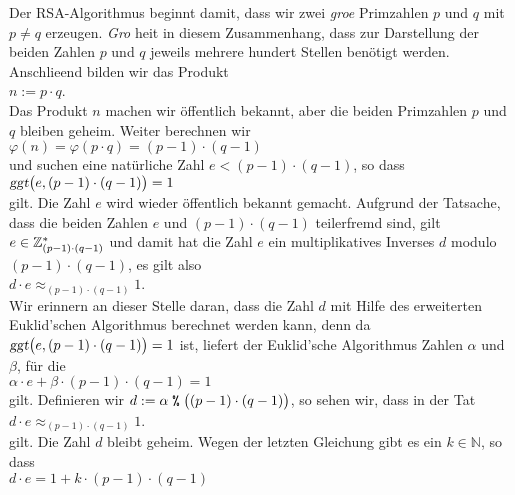 Der RSA-Algorithmus beginnt damit, dass wir zwei \emph{gro\3e} Primzahlen $p$ und $q$ mit $p \not= q$
erzeugen.  \emph{Gro\3} hei\3t in diesem Zusammenhang, dass zur Darstellung der beiden Zahlen $p$ und $q$
jeweils mehrere hundert Stellen ben\"{o}tigt werden.  Anschlie\3end bilden wir das Produkt
\\[0.2cm]
\hspace*{1.3cm}
$n := p \cdot q$.
\\[0.2cm]
Das Produkt $n$ machen wir \"{o}ffentlich bekannt, aber die beiden Primzahlen $p$ und $q$ bleiben geheim.
Weiter berechnen wir
\\[0.2cm]
\hspace*{1.3cm}
$\varphi(n) = \varphi(p \cdot q) = (p-1) \cdot (q-1)$
\\[0.2cm]
und suchen eine nat\"{u}rliche Zahl $e < (p-1) \cdot (q-1)$, so dass 
\\[0.2cm]
\hspace*{1.3cm}
$\textsl{ggt}\bigl(e, (p-1) \cdot (q-1)\bigr) = 1$
\\[0.2cm]
gilt.  Die Zahl $e$ wird wieder \"{o}ffentlich bekannt gemacht.
Aufgrund der Tatsache, dass die beiden Zahlen $e$ und $(p-1) \cdot (q-1)$
teilerfremd sind, gilt $e \in \mathbb{Z}_{(p-1) \cdot (q-1)}^*$ und damit hat die Zahl $e$ ein
multiplikatives Inverses $d$ modulo  $(p-1)\cdot(q-1)$, es gilt also
\\[0.2cm]
\hspace*{1.3cm}
$d \cdot e \approx_{(p-1)\cdot(q-1)} 1$.
\\[0.2cm]
Wir erinnern an dieser Stelle daran, dass die Zahl $d$ mit Hilfe des erweiterten Euklid'schen Algorithmus
berechnet werden kann, denn da $\textsl{ggt}\bigl(e, (p-1)\cdot(q-1)\bigr) = 1$ ist, liefert der
Euklid'sche Algorithmus Zahlen $\alpha$ und $\beta$, f\"{u}r die
\\[0.2cm]
\hspace*{1.3cm}
$\alpha \cdot e + \beta \cdot (p-1) \cdot (q-1) = 1$
\\[0.2cm]
gilt.  Definieren wir $d := \alpha \;\texttt{\%}\; \bigl((p-1) \cdot (q-1)\bigr)$, so sehen wir, dass in der Tat
\\[0.2cm]
\hspace*{1.3cm}
$d \cdot e \approx_{(p-1)\cdot(q-1)} 1$.
\\[0.2cm]
gilt.  Die Zahl $d$ bleibt geheim.
Wegen der letzten Gleichung gibt es ein $k \in \mathbb{N}$, so dass
\\[0.2cm]
\hspace*{1.3cm}
$d \cdot e = 1 + k \cdot (p-1) \cdot (q-1)$

